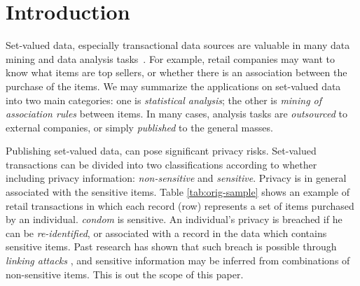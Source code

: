 \section{Introduction}
\label{sec:intro}

Set-valued data, especially transactional data sources are valuable in many data mining and data analysis tasks~\cite{agrawal1994fast,cui2002probabilistic,adar2007we}. 
For example, retail companies may want to know what items are top sellers, or whether there is an association between the purchase of the items.
We may summarize the applications on set-valued data into two main categories: 
one is {\em statistical analysis}; the other is {\em mining of association rules} between items.
In many cases, analysis tasks are {\em outsourced} to external companies, or simply {\em published} to the general masses.

Publishing set-valued data, can pose significant privacy risks. Set-valued transactions can be divided into two classifications according to whether including privacy information: {\em non-sensitive} and {\em sensitive}. Privacy is in general associated with the sensitive items. Table \ref{tab:orig-sample} shows an example of retail transactions in which each record (row) represents a set of items purchased by an individual. {\em condom} is sensitive. An individual's privacy is breached if he can be {\em re-identified}, or associated with a record in the data which contains  sensitive items.
Past research has shown that such breach is possible through {\em linking attacks} \cite{FungWCY10:Survey,samarati1998}, and sensitive information may be inferred from
combinations of non-sensitive items. This is out the scope of this paper.

